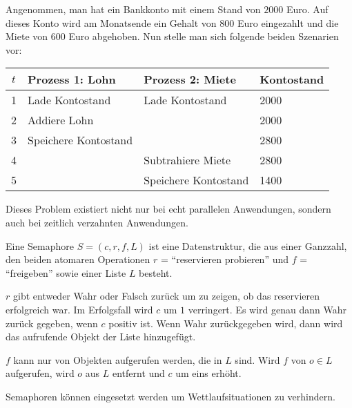 \begin{beispiel}[Wettlaufsituation]
    Angenommen, man hat ein Bankkonto mit einem Stand von $\num{2000}$ Euro.
    Auf dieses Konto wird am Monatsende ein Gehalt von $\num{800}$ Euro eingezahlt
    und die Miete von $\num{600}$ Euro abgehoben. Nun stelle man sich folgende
    beiden Szenarien vor:

    \begin{table}[h]
        \centering
        \begin{tabular}{c|l|l|l}
        $t$ & Prozess 1: Lohn        & Prozess 2: Miete     & Kontostand \\ \hline
          1 &Lade Kontostand         & Lade Kontostand      & 2000       \\
          2 & Addiere Lohn           & ~                    & 2000       \\
          3 & Speichere Kontostand   & ~                    & 2800       \\
          4 & ~                      & Subtrahiere Miete    & 2800       \\
          5 & ~                      & Speichere Kontostand & 1400       \\
        \end{tabular}
    \end{table}

    Dieses Problem existiert nicht nur bei echt parallelen Anwendungen, sondern
    auch bei zeitlich verzahnten Anwendungen.
\end{beispiel}

\begin{definition}[Semaphore]%
    Eine Semaphore $S=(c, r, f, L)$ ist eine Datenstruktur, die aus einer Ganzzahl, den beiden 
    atomaren Operationen $r$ = \enquote{reservieren probieren} und $f$ = \enquote{freigeben}
    sowie einer Liste $L$ besteht.

    $r$ gibt entweder Wahr oder Falsch zurück um zu zeigen, ob das reservieren
    erfolgreich war. Im Erfolgsfall wird $c$ um $1$ verringert. Es wird genau
    dann Wahr zurück gegeben, wenn $c$ positiv ist. Wenn Wahr zurückgegeben wird,
    dann wird das aufrufende Objekt der Liste hinzugefügt.

    $f$ kann nur von Objekten aufgerufen werden, die in $L$ sind. Wird $f$ von
    $o \in L$ aufgerufen, wird $o$ aus $L$ entfernt und $c$ um eins erhöht.
\end{definition}

Semaphoren können eingesetzt werden um Wettlaufsituationen zu verhindern.

